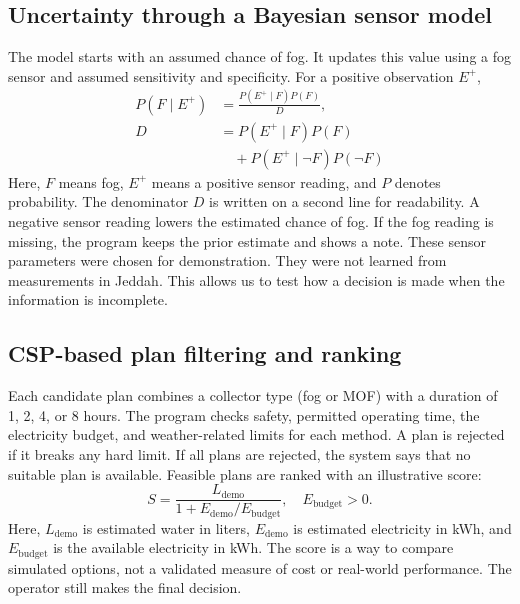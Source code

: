\documentclass[11pt,a4paper]{article}
\begin{document}
\subsection{Uncertainty through a Bayesian sensor model}
The model starts with an assumed chance of fog. It updates this value using a fog sensor and assumed sensitivity and specificity. For a positive observation $E^+$,
\begin{equation}
\begin{aligned}
P(F\mid E^+) &= \frac{P(E^+\mid F)P(F)}{D}, \\
D &= P(E^+\mid F)P(F) \\
&\quad + P(E^+\mid \neg F)P(\neg F)
\end{aligned}
\end{equation}
Here, $F$ means fog, $E^+$ means a positive sensor reading, and $P$ denotes probability. The denominator $D$ is written on a second line for readability. A negative sensor reading lowers the estimated chance of fog. If the fog reading is missing, the program keeps the prior estimate and shows a note. These sensor parameters were chosen for demonstration. They were not learned from measurements in Jeddah. This allows us to test how a decision is made when the information is incomplete.

\newpage
\subsection{CSP-based plan filtering and ranking}
Each candidate plan combines a collector type (fog or MOF) with a duration of 1, 2, 4, or 8 hours. The program checks safety, permitted operating time, the electricity budget, and weather-related limits for each method. A plan is rejected if it breaks any hard limit. If all plans are rejected, the system says that no suitable plan is available. Feasible plans are ranked with an illustrative score:
\begin{equation}
S = \frac{L_{\mathrm{demo}}}{1 + E_{\mathrm{demo}}/E_{\mathrm{budget}}},\quad E_{\mathrm{budget}}>0.
\end{equation}
Here, $L_{\mathrm{demo}}$ is estimated water in liters, $E_{\mathrm{demo}}$ is estimated electricity in kWh, and $E_{\mathrm{budget}}$ is the available electricity in kWh. The score is a way to compare simulated options, not a validated measure of cost or real-world performance. The operator still makes the final decision.

\clearpage
\end{document}
